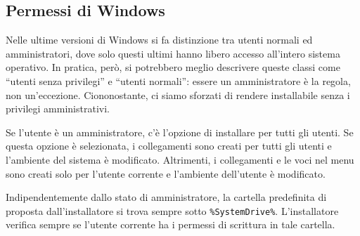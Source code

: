\documentclass{article}
\begin{document}
\subsection{Permessi di Windows}
\label{sec:winpermissions}

Nelle ultime versioni di Windows si fa distinzione tra utenti normali ed
amministratori, dove solo questi ultimi hanno libero accesso all'intero
sistema operativo. In pratica, però, si potrebbero meglio descrivere
queste classi come ``utenti senza privilegi'' e ``utenti normali'': essere
un amministratore è la regola, non un'eccezione. Ciononostante, ci siamo
sforzati di rendere \TL{} installabile senza i privilegi amministrativi.

Se l'utente è un amministratore, c'è l'opzione di installare per tutti gli
utenti. Se questa opzione è selezionata, i collegamenti sono creati per
tutti gli utenti e l'ambiente del sistema è modificato. Altrimenti, i
collegamenti e le voci nel menu sono creati solo per l'utente corrente e
l'ambiente dell'utente è modificato.

Indipendentemente dallo stato di amministratore, la cartella predefinita
di \TL{} proposta dall'installatore si trova sempre sotto
\verb|%SystemDrive%|. L'installatore verifica sempre se l'utente corrente
ha i permessi di scrittura in tale cartella.
\end{document}
